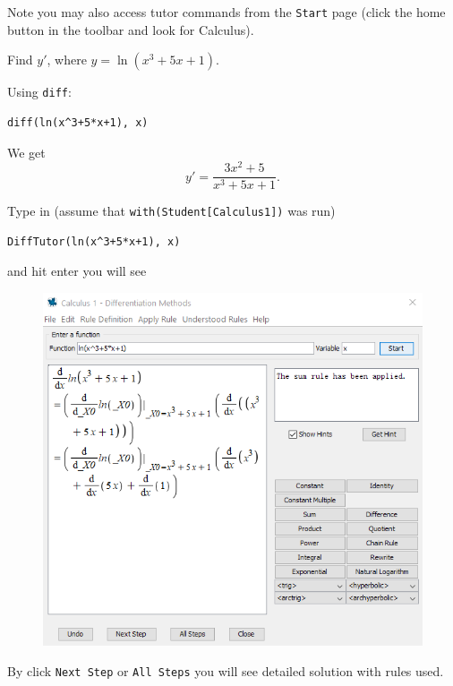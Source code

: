 \documentclass[]{book}
\theoremstyle{definition}
\theoremstyle{definition}
\theoremstyle{definition}
\theoremstyle{remark}
\let\BeginKnitrBlock\begin \let\EndKnitrBlock\end
\begin{document}
Note you may also access tutor commands from the \texttt{Start} page
(click the home button in the toolbar and look for Calculus).

\BeginKnitrBlock{example}
\protect\hypertarget{exm:unnamed-chunk-6}{}{\label{exm:unnamed-chunk-6}
}Find \(y'\), where \(y=\ln \left(x^{3}+5x+1\right)\).
\EndKnitrBlock{example}

\BeginKnitrBlock{solution}
{} Using \texttt{diff}:

\begin{verbatim}
diff(ln(x^3+5*x+1), x)
\end{verbatim}

We get \[
y'=\dfrac{3x^{2}+5}{x^{3}+5 x+1}.
\]

Type in (assume that \texttt{with(Student{[}Calculus1{]})} was run)

\begin{verbatim}
DiffTutor(ln(x^3+5*x+1), x)
\end{verbatim}

and hit enter you will see

\begin{figure}
\centering
\includegraphics{figs/DiffTutor-ex.png}
\caption{}
\end{figure}

By click \texttt{Next\ Step} or \texttt{All\ Steps} you will see
detailed solution with rules used.
\EndKnitrBlock{solution}
\end{document}

